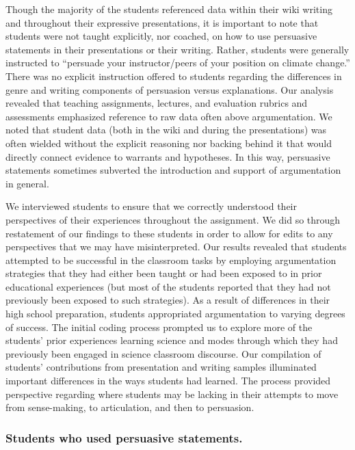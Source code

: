 \documentclass[11.5pt]{sig-alternate} %
\begin{document}
\begin{large}
Though the majority of the students referenced data within their wiki writing and throughout their expressive presentations, it is important to note that students were not taught explicitly, nor coached, on how to use persuasive statements in their presentations or their writing. Rather, students were generally instructed to “persuade your instructor/peers of your position on climate change.” There was no explicit instruction offered to students regarding the differences in genre and writing components of persuasion versus explanations. Our analysis revealed that teaching assignments, lectures, and evaluation rubrics and assessments emphasized reference to raw data often above argumentation. We noted that student data (both in the wiki and during the presentations) was often wielded without the explicit reasoning nor backing behind it that would directly connect evidence to warrants and hypotheses. In this way, persuasive statements sometimes subverted the introduction and support of argumentation in general. 

We interviewed students to ensure that we correctly understood their perspectives of their experiences throughout the assignment. We did so through restatement of our findings to these students in order to allow for edits to any perspectives that we may have misinterpreted. Our results revealed that students attempted to be successful in the classroom tasks by employing argumentation strategies that they had either been taught or had been exposed to in prior educational experiences (but most of the students reported that they had not previously been exposed to such strategies). As a result of differences in their high school preparation, students appropriated argumentation to varying degrees of success. The initial coding process prompted us to explore more of the students’ prior experiences learning science and modes through which they had previously been engaged in science classroom discourse. Our compilation of students’ contributions from presentation and writing samples illuminated important differences in the ways students had learned. The process provided perspective regarding where students may be lacking in their attempts to move from sense-making, to articulation, and then to persuasion.

\subsubsection*{Students who used persuasive statements.}


\end{large}
\end{document}
